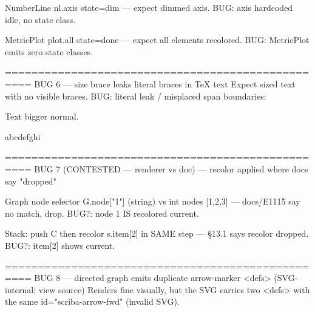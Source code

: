 NumberLine nl.axis state=dim — expect dimmed axis. BUG: axis hardcoded idle, no state class.

\begin{diagram}[id="b5a"]
\end{diagram}

MetricPlot plot.all state=done — expect all elements recolored. BUG: MetricPlot emits zero state classes.

\begin{diagram}[id="b5b"]
\end{diagram}

==================================================
BUG 6 — size brace leaks literal braces in TeX text
Expect sized text with no visible braces. BUG: literal { } leak / misplaced span boundaries:

Text {\large bigger} normal.

{\tiny a}{\scriptsize b}{\small c}{\normalsize d}{\large e}{\Large f}{\LARGE g}{\huge h}{\Huge i}

==================================================
BUG 7 (CONTESTED — renderer vs doc) — recolor applied where docs say "dropped"

Graph node selector G.node["1"] (string) vs int nodes [1,2,3] — docs/E1115 say no match, drop. BUG?: node 1 IS recolored current.

\begin{diagram}[id="b7a"]
\end{diagram}

Stack: push C then recolor s.item[2] in SAME step — §13.1 says recolor dropped. BUG?: item[2] shows current.

\begin{animation}[id="b7b", label="stack gotcha same step"]
\step
{}
\end{animation}

==================================================
BUG 8 — directed graph emits duplicate arrow-marker <defs> (SVG-internal; view source)
Renders fine visually, but the SVG carries two <defs> with the same id="scriba-arrow-fwd" (invalid SVG).

\begin{diagram}[id="b8a"]
\end{diagram}
